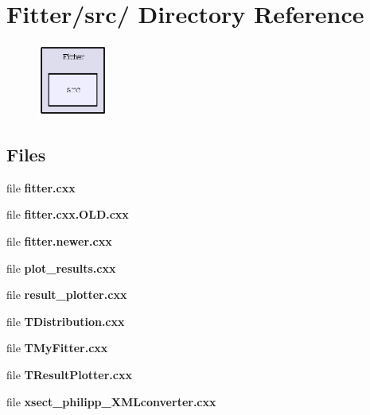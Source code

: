 \section{Fitter/src/ Directory Reference}
\label{dir_1b85a3a5d13a33d3398337edd1e9770e}


\begin{figure}[H]
\begin{center}
\leavevmode
\includegraphics[width=65pt]{dir_1b85a3a5d13a33d3398337edd1e9770e_dep}
\end{center}
\end{figure}
\subsection*{Files}
\begin{CompactItemize}
\item 
file \textbf{fitter.cxx}
\item 
file \textbf{fitter.cxx.OLD.cxx}
\item 
file \textbf{fitter.newer.cxx}
\item 
file \textbf{plot\_\-results.cxx}
\item 
file \textbf{result\_\-plotter.cxx}
\item 
file \textbf{TDistribution.cxx}
\item 
file \textbf{TMy\-Fitter.cxx}
\item 
file \textbf{TResult\-Plotter.cxx}
\item 
file \textbf{xsect\_\-philipp\_\-XMLconverter.cxx}
\end{CompactItemize}
